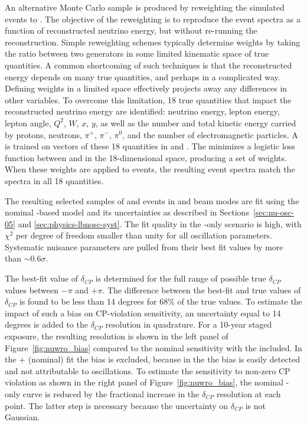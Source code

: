 An alternative Monte Carlo sample is produced by reweighting the  simulated events to . The objective of the reweighting is to reproduce the  event spectra as a function of reconstructed neutrino energy, but without re-running the reconstruction. Simple reweighting schemes typically determine weights by taking the ratio between two generators in some limited kinematic space of true quantities. A common shortcoming of such techniques is that the reconstructed energy depends on many true quantities, and perhaps in a complicated way. Defining weights in a limited space effectively projects away any differences in other variables. To overcome this limitation, 18 true quantities that impact the reconstructed neutrino energy are identified: neutrino energy, lepton energy, lepton angle, $Q^{2}$, $W$, $x$, $y$, as well as the number and total kinetic energy carried by protons, neutrons, $\pi^{+}$, $\pi^{-}$, $\pi^{0}$, and the number of electromagnetic particles. A  is trained on vectors of these 18 quantities in  and . The  minimizes a logistic loss function between  and  in the 18-dimensional space, producing a set of weights. When these weights are applied to  events, the resulting event spectra match the  spectra in all 18 quantities.

The resulting selected samples of  \numu and \nue {} events in  and  beam modes are fit using the nominal -based model and its uncertainties as described in Sections~\ref{sec:nu-osc-05} and \ref{sec:physics-lbnosc-syst}. The fit quality in the -only scenario is high, with $\chi^{2}$ per degree of freedom smaller than unity for all oscillation parameters. Systematic nuisance parameters are pulled from their best fit values by more than $\sim$0.6$\sigma$. 

The best-fit value of $\delta_{CP}$ is determined for the full range of possible true $\delta_{CP}$ values between $-\pi$ and $+\pi$. The difference between the best-fit and true values of $\delta_{CP}$ is found to be less than 14 degrees for 68\% of the true values. To estimate the impact of such a bias on CP-violation sensitivity, an uncertainty equal to 14 degrees is added to the $\delta_{CP}$ resolution in quadrature. For a 10-year staged   exposure, the resulting resolution is shown in the left panel of Figure~\ref{fig:nuwro_bias} compared to the nominal sensitivity with the  included. In the + (nominal) fit the bias is excluded, because in the  the bias is easily detected and not attributable to oscillations. To estimate the sensitivity to non-zero CP violation as shown in the right panel of Figure~\ref{fig:nuwro_bias}, the nominal -only curve is reduced by the fractional increase in the $\delta_{CP}$ resolution at each point. The latter step is necessary because the uncertainty on $\delta_{CP}$ is not Gaussian.

